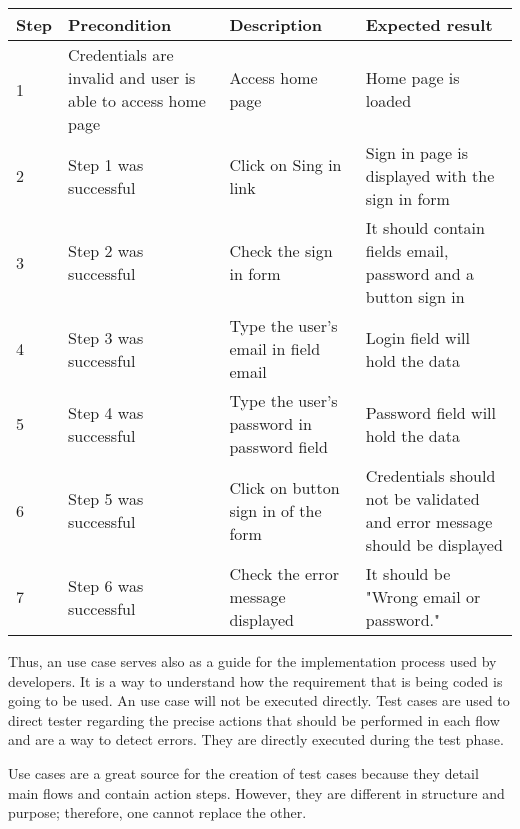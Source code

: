 \begin{center}
\begin{tabular}{| l | p{3cm} | p{5cm} | p{5cm} |}
\hline

Step & Precondition & Description & Expected result \\ \hline

1 & Credentials are invalid and user is able to access home page & Access home page & Home page is loaded\\ \hline

2 & Step 1 was successful & Click on Sing in link & Sign in page is displayed with the sign in form \\ \hline

3 & Step 2 was successful & Check the sign in form & It should contain fields email, password and a button sign in \\ \hline

4 & Step 3 was successful & Type the user's email in field email & Login field will hold the data\\ \hline

5 & Step 4 was successful & Type the user's password in password field & Password field will hold the data \\ \hline

6 & Step 5 was successful & Click on button sign in of the form & Credentials should not be validated and error message should be displayed \\ \hline

7 & Step 6 was successful & Check the error message displayed & It should be "Wrong email or password."\\

\hline
\end{tabular}

\end{center}







Thus, an use case serves also as a guide for the implementation process used by developers. It is a way to understand how the requirement that is being coded is going to be used. An use case will not be executed directly. Test cases are used to direct tester regarding the precise actions that should be performed in each flow and are a way to detect errors. They are directly executed during the test phase.

Use cases are a great source for the creation of test cases because they detail main flows and contain action steps. However, they are different in structure and purpose; therefore, one cannot replace the other.

